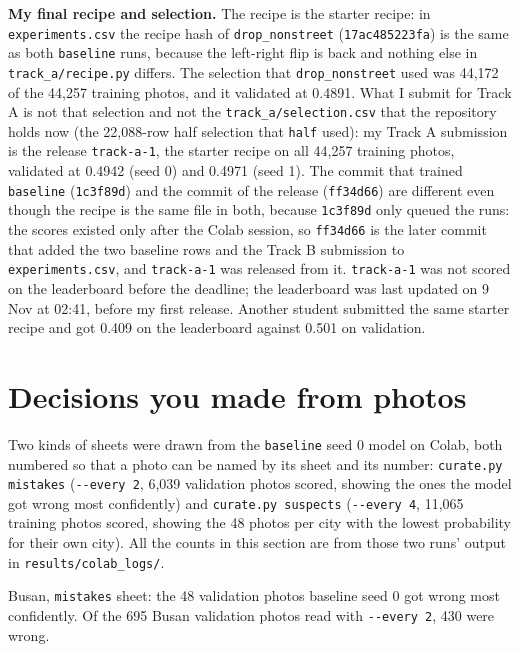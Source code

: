\documentclass[11pt]{article}
\begin{document}
\textbf{My final recipe and selection.} The recipe is the starter recipe: in
\texttt{experiments.csv} the recipe hash of \texttt{drop\_nonstreet}
(\texttt{17ac485223fa}) is the same as both \texttt{baseline} runs, because the
left-right flip is back and nothing else in \texttt{track\_a/recipe.py} differs.
The selection that \texttt{drop\_nonstreet} used was 44,172 of the 44,257
training photos, and it validated at 0.4891. What I submit for Track A is not
that selection and not the \texttt{track\_a/selection.csv} that the repository
holds now (the 22,088-row half selection that \texttt{half} used): my Track A
submission is the release \texttt{track-a-1}, the starter
recipe on all 44,257 training photos, validated at 0.4942 (seed 0) and 0.4971
(seed 1). The commit that trained \texttt{baseline} (\texttt{1c3f89d}) and the
commit of the release (\texttt{ff34d66}) are different even though the recipe is
the same file in both, because \texttt{1c3f89d} only queued the runs: the scores
existed only after the Colab session, so \texttt{ff34d66} is the later commit
that added the two baseline rows and the Track B submission to
\texttt{experiments.csv}, and \texttt{track-a-1} was released from it.
\texttt{track-a-1} was not scored on the leaderboard before the deadline; the
leaderboard was last updated on 9 Nov at 02:41, before my first release. Another
student submitted the same starter recipe and got 0.409 on the leaderboard
against 0.501 on validation.

\section*{Decisions you made from photos}

Two kinds of sheets were drawn from the \texttt{baseline} seed 0 model on Colab,
both numbered so that a photo can be named by its sheet and its number:
\texttt{curate.py mistakes} (\texttt{-{}-every 2}, 6,039 validation photos scored,
showing the ones the model got wrong most confidently) and
\texttt{curate.py suspects} (\texttt{-{}-every 4}, 11,065 training photos scored,
showing the 48 photos per city with the lowest probability for their own city).
All the counts in this section are from those two runs' output in
\texttt{results/colab\_logs/}.


\begin{center}\footnotesize
Busan, \texttt{mistakes} sheet: the 48 validation photos baseline seed 0 got
wrong most confidently. Of the 695 Busan validation photos read with
\texttt{-{}-every 2}, 430 were wrong.
\end{center}
\end{document}
